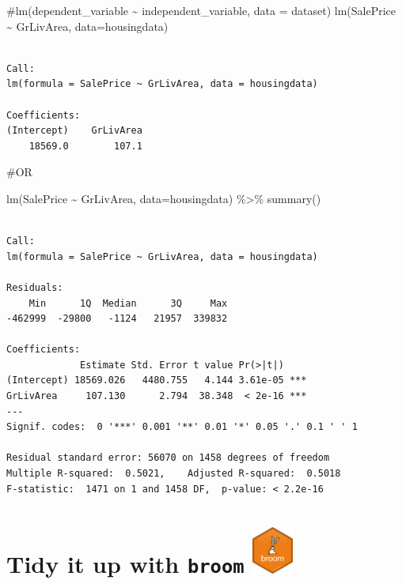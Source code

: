 \documentclass[
  letterpaper,
  DIV=11,
  numbers=noendperiod]{scrartcl}
\newenvironment{Shaded}{\begin{snugshade}}{\end{snugshade}}
\newcommand{\AttributeTok}[1]{\textcolor[rgb]{0.40,0.45,0.13}{#1}}
\newcommand{\CommentTok}[1]{\textcolor[rgb]{0.37,0.37,0.37}{#1}}
\newcommand{\FunctionTok}[1]{\textcolor[rgb]{0.28,0.35,0.67}{#1}}
\newcommand{\NormalTok}[1]{\textcolor[rgb]{0.00,0.23,0.31}{#1}}
\newcommand{\SpecialCharTok}[1]{\textcolor[rgb]{0.37,0.37,0.37}{#1}}
\begin{document}
\begin{Shaded}
\begin{Highlighting}[]
\CommentTok{\#lm(dependent\_variable \textasciitilde{} independent\_variable, data = dataset)}
\FunctionTok{lm}\NormalTok{(SalePrice }\SpecialCharTok{\textasciitilde{}}\NormalTok{ GrLivArea, }\AttributeTok{data=}\NormalTok{housingdata)}
\end{Highlighting}
\end{Shaded}

\begin{verbatim}

Call:
lm(formula = SalePrice ~ GrLivArea, data = housingdata)

Coefficients:
(Intercept)    GrLivArea  
    18569.0        107.1  
\end{verbatim}

\begin{Shaded}
\begin{Highlighting}[]
\CommentTok{\#OR}

\FunctionTok{lm}\NormalTok{(SalePrice }\SpecialCharTok{\textasciitilde{}}\NormalTok{ GrLivArea, }\AttributeTok{data=}\NormalTok{housingdata) }\SpecialCharTok{\%\textgreater{}\%} 
  \FunctionTok{summary}\NormalTok{()}
\end{Highlighting}
\end{Shaded}

\begin{verbatim}

Call:
lm(formula = SalePrice ~ GrLivArea, data = housingdata)

Residuals:
    Min      1Q  Median      3Q     Max 
-462999  -29800   -1124   21957  339832 

Coefficients:
             Estimate Std. Error t value Pr(>|t|)    
(Intercept) 18569.026   4480.755   4.144 3.61e-05 ***
GrLivArea     107.130      2.794  38.348  < 2e-16 ***
---
Signif. codes:  0 '***' 0.001 '**' 0.01 '*' 0.05 '.' 0.1 ' ' 1

Residual standard error: 56070 on 1458 degrees of freedom
Multiple R-squared:  0.5021,    Adjusted R-squared:  0.5018 
F-statistic:  1471 on 1 and 1458 DF,  p-value: < 2.2e-16
\end{verbatim}

\hypertarget{tidy-it-up-with-broom}{%
\section[Tidy it up with \texttt{broom} ]{\texorpdfstring{Tidy it up
with \texttt{broom}
\protect\includegraphics[width=0.1\textwidth,height=\textheight]{118_M_SLR_Notes_files/mediabag/logo.png}}{Tidy it up with broom }}\label{tidy-it-up-with-broom}}
\end{document}
